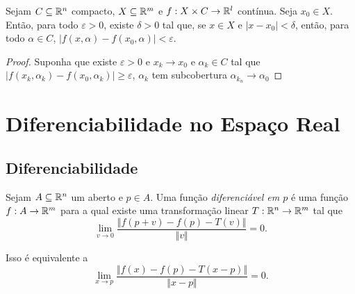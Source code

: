 \begin{prop}
	Sejam $C \subseteq \mathbb{R}^n$ compacto, $X \subseteq \mathbb{R}^m$ e $f: X \times C \to \mathbb{R}^l$ contínua. Seja $x_0 \in X$. Então, para todo $\varepsilon > 0$, existe $\delta > 0$ tal que, se $x \in X$ e $|x-x_0| < \delta$, então, para todo $\alpha \in C$, $|f(x,\alpha)-f(x_0,\alpha)|<\varepsilon$.
\end{prop}
\begin{proof}
	Suponha que existe $\varepsilon>0$ e $x_k \to x_0$ e $\alpha_k \in C$ tal que $|f(x_k,\alpha_k)-f(x_0, \alpha_k)| \geq \varepsilon$, $\alpha_k$ tem subcobertura $\alpha_{k_n} \to \alpha_0$
\end{proof}











\chapter{Diferenciabilidade no Espaço Real}

\section{Diferenciabilidade}

\begin{defi}
	Sejam $A \subseteq \mathbb{R}^n$ um aberto e $p \in A$. Uma função \emph{diferenciável em $p$} é uma função $f: A \to \mathbb{R}^m$ para a qual existe uma transformação linear $T : \mathbb{R}^n \to \mathbb{R}^m$ tal que
	\begin{equation*}
	\lim_{v \to 0} \frac{\Vert f(p+v)-f(p)-T(v) \Vert}{\Vert v \Vert} = 0.
	\end{equation*}
\end{defi}

Isso é equivalente a
	\begin{equation*}
	\lim_{x \to p} \frac{\Vert f(x)-f(p)-T(x-p) \Vert}{\Vert x-p \Vert} = 0.
	\end{equation*}

